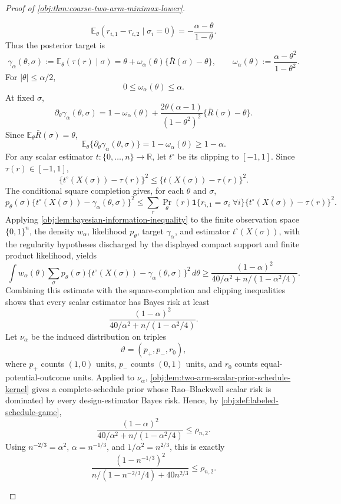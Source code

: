 \documentclass[11pt]{article}
\begin{document}
\begin{proof}[Proof of \cref{obj:thm:coarse-two-arm-minimax-lower}]
\begin{enumerate}
\[
\mathbb E_\theta(r_{i,1}-r_{i,2}\mid \sigma_i=0)=-\frac{\alpha-\theta}{1-\theta}.
\]
Thus the posterior target is
\[
\gamma_\alpha(\theta,\sigma)
:=
\mathbb E_\theta(\tau(r)\mid \sigma)
=
\theta+\omega_\alpha(\theta)\{\bar R(\sigma)-\theta\},
\qquad
\omega_\alpha(\theta):=\frac{\alpha-\theta^2}{1-\theta^2}.
\]
For \(|\theta|\le\alpha/2\),
\[
0\le \omega_\alpha(\theta)\le \alpha.
\]
At fixed \(\sigma\),
\[
\partial_\theta\gamma_\alpha(\theta,\sigma)
=
1-\omega_\alpha(\theta)
+
\frac{2\theta(\alpha-1)}{(1-\theta^2)^2}
\{\bar R(\sigma)-\theta\}.
\]
Since \(\mathbb E_\theta\bar R(\sigma)=\theta\),
\[
\mathbb E_\theta\{\partial_\theta\gamma_\alpha(\theta,\sigma)\}
=
1-\omega_\alpha(\theta)
\ge
1-\alpha.
\]
For any scalar estimator \(t:\{0,\ldots,n\}\to\mathbb R\), let \(t^\circ\) be its clipping to \([-1,1]\). Since \(\tau(r)\in[-1,1]\),
\[
\{t^\circ(X(\sigma))-\tau(r)\}^2
\le
\{t(X(\sigma))-\tau(r)\}^2.
\]
The conditional square completion gives, for each \(\theta\) and \(\sigma\),
\[
p_\theta(\sigma)\{t^\circ(X(\sigma))-\gamma_\alpha(\theta,\sigma)\}^2
\le
\sum_r
\Pr_\theta(r)\mathbf 1\{r_{i,1}=\sigma_i\ \forall i\}
\{t^\circ(X(\sigma))-\tau(r)\}^2 .
\]
Applying \cref{obj:lem:bayesian-information-inequality} to the finite observation space \(\{0,1\}^n\), the density \(w_\alpha\), likelihood \(p_\theta\), target \(\gamma_\alpha\), and estimator \(t^\circ(X(\sigma))\), with the regularity hypotheses discharged by the displayed compact support and finite product likelihood, yields
\[
\int w_\alpha(\theta)
\sum_\sigma
p_\theta(\sigma)
\{t^\circ(X(\sigma))-\gamma_\alpha(\theta,\sigma)\}^2\,d\theta
\ge
\frac{(1-\alpha)^2}
{40/\alpha^2+n/(1-\alpha^2/4)}.
\]
Combining this estimate with the square-completion and clipping inequalities shows that every scalar estimator has Bayes risk at least
\[
\frac{(1-\alpha)^2}
{40/\alpha^2+n/(1-\alpha^2/4)}.
\]
Let \(\nu_\alpha\) be the induced distribution on triples
\[
\vartheta=(p_+,p_-,r_0),
\]
where \(p_+\) counts \((1,0)\) units, \(p_-\) counts \((0,1)\) units, and \(r_0\) counts equal-potential-outcome units. Applied to \(\nu_\alpha\), \cref{obj:lem:two-arm-scalar-prior-schedule-kernel} gives a complete-schedule prior whose Rao--Blackwell scalar risk is dominated by every design-estimator Bayes risk. Hence, by \cref{obj:def:labeled-schedule-game},
\[
\frac{(1-\alpha)^2}
{40/\alpha^2+n/(1-\alpha^2/4)}
\le
\rho_{n,2}.
\]
Using \(n^{-2/3}=\alpha^2\), \(\alpha=n^{-1/3}\), and \(1/\alpha^2=n^{2/3}\), this is exactly
\[
\frac{(1-n^{-1/3})^2}
{n/(1-n^{-2/3}/4)+40n^{2/3}}
\le
\rho_{n,2}.
\]


\end{enumerate}
\end{proof}
\end{document}
